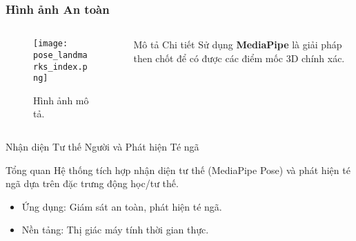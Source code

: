 \begin{frame}
\frametitle{Hình ảnh An toàn}
\begin{columns}
\begin{column}{0.4\textwidth}
    \begin{figure}
    \centering
    \texttt{[image: pose\_landmarks\_index.png]}
    \caption{Hình ảnh mô tả.}
    \end{figure}
\end{column}
\begin{column}{0.6\textwidth}
    \begin{block}{Mô tả Chi tiết}
    Sử dụng \textbf{MediaPipe} là giải pháp then chốt để có được các điểm mốc 3D chính xác.
    \end{block}
\end{column}
\end{columns}
\end{frame}


\begin{frame}{Nhận diện Tư thế Người và Phát hiện Té ngã}
    \begin{block}{Tổng quan}
        Hệ thống tích hợp nhận diện tư thế (MediaPipe Pose) và phát hiện té ngã dựa trên đặc trưng động học/tư thế.
        \begin{itemize}
            \item Ứng dụng: Giám sát an toàn, phát hiện té ngã.
            \item Nền tảng: Thị giác máy tính thời gian thực.
        \end{itemize}
    \end{block}
\end{frame}


